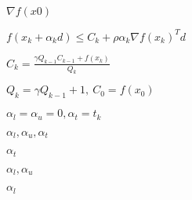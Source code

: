 \documentclass{article}
\begin{document}
$\nabla f(x0)$
\pagebreak

$ f(x_k + \alpha_k d) \leq C_k + \rho \alpha_k \nabla f(x_k)^T d $
\pagebreak

$ C_k = \frac{\gamma Q_{k-1}C_{k-1} + f(x_k)}{Q_k} $
\pagebreak

$ Q_k = \gamma Q_{k-1} + 1,\ C_0 = f(x_0) $
\pagebreak

$ \alpha_l = \alpha_u = 0, \alpha_t = t_k $
\pagebreak

$ \alpha_l, \alpha_u, \alpha_t $
\pagebreak

$ \alpha_t $
\pagebreak

$ \alpha_l, \alpha_u$
\pagebreak

$ \alpha_l $
\pagebreak
\end{document}
